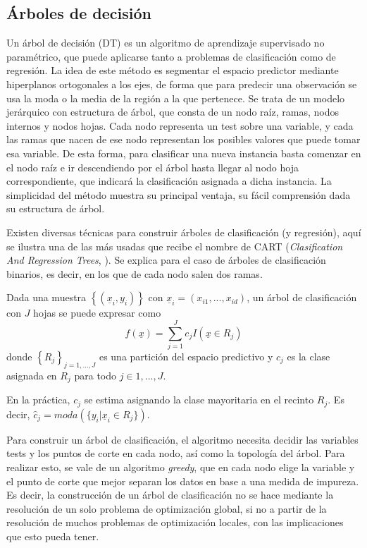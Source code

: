 \documentclass[12pt,a4paper,]{book}
\numberwithin{dummy}{section}
\theoremstyle{ocrenumbox}
\theoremstyle{blacknumex}
\theoremstyle{blacknumbox}
\theoremstyle{ocrenum}
\theoremstyle{ocrenum}
\begin{document}
\hypertarget{uxe1rboles-de-decisiuxf3n}{%
\subsection{Árboles de decisión}\label{uxe1rboles-de-decisiuxf3n}}

Un árbol de decisión (DT) es un algoritmo de aprendizaje supervisado no
paramétrico, que puede aplicarse tanto a problemas de clasificación como
de regresión. La idea de este método es segmentar el espacio predictor
mediante hiperplanos ortogonales a los ejes, de forma que para predecir
una observación se usa la moda o la media de la región a la que
pertenece. Se trata de un modelo jerárquico con estructura de árbol, que
consta de un nodo raíz, ramas, nodos internos y nodos hojas. Cada nodo
representa un test sobre una variable, y cada las ramas que nacen de ese
nodo representan los posibles valores que puede tomar esa variable. De
esta forma, para clasificar una nueva instancia basta comenzar en el
nodo raíz e ir descendiendo por el árbol hasta llegar al nodo hoja
correspondiente, que indicará la clasificación asignada a dicha
instancia. La simplicidad del método muestra su principal ventaja, su
fácil comprensión dada su estructura de árbol.

Existen diversas técnicas para construir árboles de clasificación (y
regresión), aquí se ilustra una de las más usadas que recibe el nombre
de CART (\emph{Clasification And Regression Trees},
\citet{breiman1984classification}). Se explica para el caso de árboles
de clasificación binarios, es decir, en los que de cada nodo salen dos
ramas.

Dada una muestra \(\left\{ (\underline x_i,y_i) \right\}\) con
\(\underline x_i = (x_{i1},...,x_{id})\), un árbol de clasificación con
\(J\) hojas se puede expresar como
\[f(\underline x) = \sum_{j=1}^J c_j I(\underline x \in R_j)\] donde
\(\left\{ R_j\right\}_{j=1,...,J}\) es una partición del espacio
predictivo y \(c_j\) es la clase asignada en \(R_j\) para todo
\(j \in {1,...,J}\).

En la práctica, \(c_j\) se estima asignando la clase mayoritaria en el
recinto \(R_j\). Es decir,
\(\hat c_j = moda(\{y_i | \underline x_i \in R_j\})\).

Para construir un árbol de clasificación, el algoritmo necesita decidir
las variables tests y los puntos de corte en cada nodo, así como la
topología del árbol. Para realizar esto, se vale de un algoritmo
\emph{greedy}, que en cada nodo elige la variable y el punto de corte
que mejor separan los datos en base a una medida de impureza. Es decir,
la construcción de un árbol de clasificación no se hace mediante la
resolución de un solo problema de optimización global, si no a partir de
la resolución de muchos problemas de optimización locales, con las
implicaciones que esto pueda tener.
\end{document}

